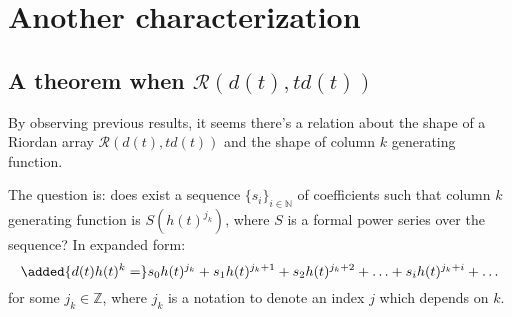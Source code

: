 \documentclass[11pt,a4paper]{article} %
\begin{document}
    \title{\rmfamily\normalfont{}}
    \author{ \\ }
    \date{\today} 
    
    \maketitle
    
    \begin{abstract}
        This short document is a collection of some \emph{Riordan arrays}, coloured 
        according different partition schemes.
    \end{abstract}
       
    \tableofcontents

    \newpage


    \section{Another characterization}

    \subsection{A theorem when $\mathcal{R}(d(t), td(t))$}

    By observing previous results, it seems there's a relation
    about the shape of a Riordan array $\mathcal{R}(d(t), td(t))$ 
    and the shape of column $k$ generating function. 
    
    The question is: does exist a sequence $\lbrace s_i \rbrace_{i \in \mathbb{N}}$ 
    of coefficients such that column $k$ generating function is $S(h(t)^{j_k})$, where $S$
    is a formal power series over the sequence? In expanded form: 
    \begin{displaymath}
        \added{d(t)h(t)^k = }s_0h(t)^{j_k} + s_1 h(t)^{j_k+1} + s_2 h(t)^{j_k+2} + 
            \ldots + s_i h(t)^{j_k+i} + \ldots
    \end{displaymath}
    for some $j_k \in \mathbb{Z}$, where $j_k$ is a notation to denote an index $j$ 
    which depends on $k$.
\end{document}
